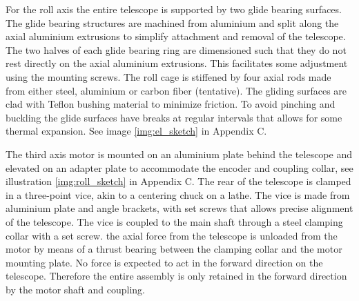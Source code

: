 For the roll axis the entire telescope is supported by two glide bearing surfaces. The glide bearing structures are machined from  aluminium and split along the axial aluminium extrusions to simplify attachment and removal of the telescope. The  two halves of each glide bearing ring are dimensioned such that they do not rest directly on the axial aluminium extrusions. This facilitates some adjustment using the mounting screws. The roll cage is stiffened by four axial rods made from either steel, aluminium or carbon fiber (tentative). The gliding surfaces are clad with Teflon bushing material to minimize friction. To avoid pinching and buckling the glide surfaces have breaks at regular intervals that allows for some thermal expansion. See image \ref{img:el_sketch} in Appendix C. 

The third axis motor is mounted on an aluminium plate behind the telescope and elevated on an adapter plate to accommodate the encoder and coupling collar, see illustration \ref{img:roll_sketch} in Appendix C. The rear of the telescope is clamped in a three-point vice, akin to a centering chuck on a lathe. The vice is made from aluminium plate and angle brackets, with set screws that allows precise alignment of the telescope. The vice is coupled to the main shaft through a steel clamping collar with a set screw. the axial force from the telescope is unloaded from the motor by means of a thrust bearing between the clamping collar and the motor mounting plate. No force is expected to act in the forward direction on the telescope. Therefore the entire assembly is only retained in the forward direction by the motor shaft and coupling. 


